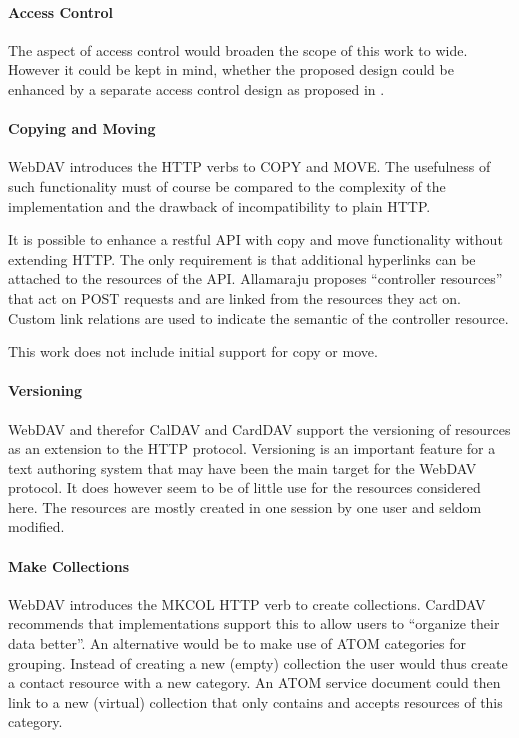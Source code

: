\documentclass[12pt,a4paper]{scrartcl}		%
\begin{document}
\paragraph{Access Control}
The aspect of access control would broaden the scope of this work to
wide. However it could be kept in mind, whether the proposed design could be
enhanced by a separate access control design as proposed in
\cite{conf/rest/GrafZLW11}.

\paragraph{Copying and Moving}
WebDAV introduces the HTTP verbs to COPY and MOVE. The usefulness of such
functionality must of course be compared to the complexity of the implementation
and the drawback of incompatibility to plain HTTP.

It is possible to enhance a restful API with copy and move functionality without
extending HTTP. The only requirement is that additional hyperlinks can be
attached to the resources of the API. Allamaraju \cite[Ch. 11]{Allamaraju_2010} proposes
``controller resources'' that act on POST requests and are linked from the
resources they act on. Custom link relations are used to indicate the semantic
of the controller resource.

This work does not include initial support for copy or move.

\paragraph{Versioning}
WebDAV and therefor CalDAV and CardDAV support the versioning of resources as an
extension to the HTTP protocol. Versioning is an important feature for a text
authoring system that may have been the main target for the WebDAV protocol.  It
does however seem to be of little use for the resources considered here. The
resources are mostly created in one session by one user and seldom modified.

\paragraph{Make Collections}
WebDAV introduces the MKCOL HTTP verb to create collections. CardDAV recommends
that implementations support this to allow users to ``organize their data
better''. An alternative would be to make use of ATOM categories for
grouping. Instead of creating a new (empty) collection the user would thus
create a contact resource with a new category. An ATOM service document could
then link to a new (virtual) collection that only contains and accepts resources
of this category.
\end{document}
